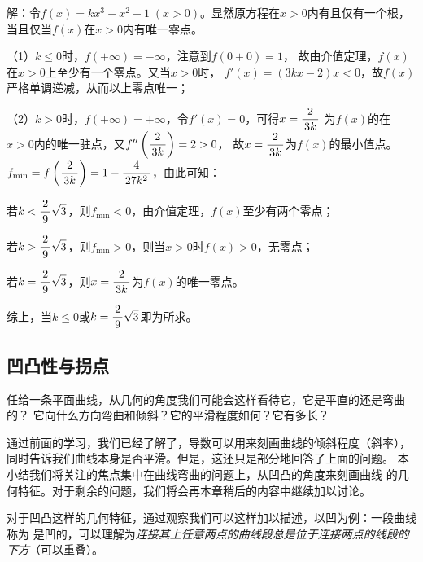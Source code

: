 解：令$f(x)=kx^3-x^2+1\;(x>0)$。显然原方程在$x>0$内有且仅有一个根，
当且仅当$f(x)$在$x>0$内有唯一零点。

（1）$k\leq 0$时，$f(+\infty)=-\infty$，注意到$f(0+0)=1$，
故由介值定理，$f(x)$在$x>0$上至少有一个零点。又当$x>0$时，
$f'(x)=(3kx-2)x<0$，故$f(x)$严格单调递减，从而以上零点唯一；

（2）$k>0$时，$f(+\infty)=+\infty$，令$f'(x)=0$，可得$x=\displaystyle\frac{\,{2}\,}{\,{3k}\,}$
为$f(x)$的在$x>0$内的唯一驻点，又$f''\left(\displaystyle\frac{\,{2}\,}{\,{3k}\,}\right)=2>0$，
故$x=\displaystyle\frac{\,{2}\,}{\,{3k}\,}$为$f(x)$的最小值点。$f_{\min}=f\left(\displaystyle\frac{\,{2}\,}{\,{3k}\,}\right)=1
-\displaystyle\frac{\,{4}\,}{\,{27k^2}\,}$，由此可知：

若$k<\displaystyle\frac{\,{2}\,}{\,{9}\,}\sqrt3$，则$f_{\min}<0$，由介值定理，$f(x)$至少有两个零点；

若$k>\displaystyle\frac{\,{2}\,}{\,{9}\,}\sqrt3$，则$f_{\min}>0$，则当$x>0$时$f(x)>0$，无零点；

若$k=\displaystyle\frac{\,{2}\,}{\,{9}\,}\sqrt3$，则$x=\displaystyle\frac{\,{2}\,}{\,{3k}\,}$为$f(x)$的唯一零点。

综上，当$k\leq 0$或$k=\displaystyle\frac{\,{2}\,}{\,{9}\,}\sqrt3$即为所求。\fin

\subsection{凹凸性与拐点}

任给一条平面曲线，从几何的角度我们可能会这样看待它，它是平直的还是弯曲的？
它向什么方向弯曲和倾斜？它的平滑程度如何？它有多长？

通过前面的学习，我们已经了解了，导数可以用来刻画曲线的倾斜程度（斜率），
同时告诉我们曲线本身是否平滑。但是，这还只是部分地回答了上面的问题。
本小结我们将关注的焦点集中在曲线弯曲的问题上，从凹凸的角度来刻画曲线
的几何特征。对于剩余的问题，我们将会再本章稍后的内容中继续加以讨论。


对于凹凸这样的几何特征，通过观察我们可以这样加以描述，以凹为例：一段曲线称为
是凹的，可以理解为{\it 连接其上任意两点的曲线段总是位于连接两点的线段的下方}（可以重叠）。
	
